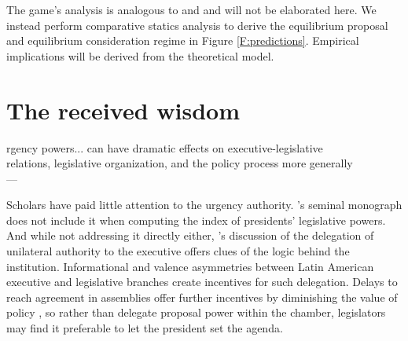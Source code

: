 \documentclass[letter,12pt]{article}
\begin{document}
The game's analysis is analogous to \citet{magar.nd} and \citet{dion.huber.1996} and will not be elaborated here. We instead perform comparative statics analysis to derive the equilibrium proposal and equilibrium consideration regime in Figure \ref{F:predictions}. Empirical implications will be derived from the theoretical model. 


\section{The received wisdom}

\begin{center}
\singlespacing
[U]rgency powers... can have dramatic effects on executive-legislative \\ 
relations, legislative organization, and the policy process more generally\\ 
---\citet[][:438]{morgenstern.2002b}
\end{center}
\onehalfspacing


\noindent Scholars have paid little attention to the urgency authority. \citeauthor{shugart.carey.1992}'s \citeyearpar{shugart.carey.1992} seminal monograph does not include it when computing the index of presidents' legislative powers. And while not addressing it directly either, \citeauthor{carey.shugart.1998a}'s \citeyearpar{carey.shugart.1998a} discussion of the delegation of unilateral authority to the executive offers clues of the logic behind the institution. Informational and valence asymmetries between Latin American executive and legislative branches create incentives for such delegation. Delays to reach agreement in assemblies offer further incentives by diminishing the value of policy \citep{baron.ferejohn.1989}, so rather than delegate proposal power within the chamber, legislators may find it preferable to let the president set the agenda. 
\end{document}
